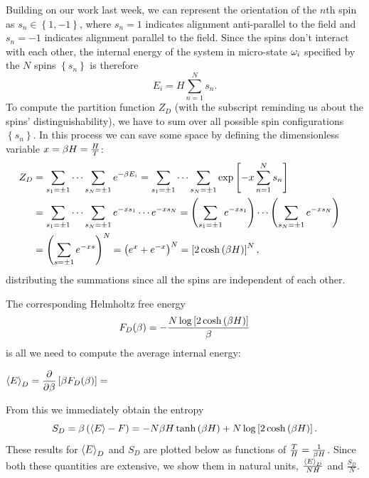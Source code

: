 Building on our work last week, we can represent the orientation of the $n$th spin as $s_n \in \left\{1, -1\right\}$, where $s_n = 1$ indicates alignment anti-parallel to the field and $s_n = -1$ indicates alignment parallel to the field.
Since the spins don't interact with each other, the internal energy of the system in micro-state $\omega_i$ specified by the $N$ spins $\left\{s_n\right\}$ is therefore
\begin{equation}
  \label{eq:spin_energy}
  E_i = H \sum_{n = 1}^N s_n.
\end{equation}
To compute the partition function $Z_D$ (with the subscript reminding us about the spins' distinguishability), we have to sum over all possible spin configurations $\left\{s_n\right\}$.
In this process we can save some space by defining the dimensionless variable $x = \beta H = \frac{H}{T}$:
\begin{align}
  Z_D & = \sum_{s_1 = \pm 1} \cdots \sum_{s_N = \pm 1} e^{-\beta E_i} = \sum_{s_1 = \pm 1} \cdots \sum_{s_N = \pm 1} \exp\left[-x \sum_{n = 1}^N s_n\right] \cr
      & = \sum_{s_1 = \pm 1} \cdots \sum_{s_N = \pm 1} e^{-x s_1} \cdots e^{-x s_N} = \left(\sum_{s_1 = \pm 1} e^{-x s_1}\right) \cdots \left(\sum_{s_N = \pm 1} e^{-x s_N}\right) \cr
      & = \left(\sum_{s = \pm 1} e^{-x s}\right)^N = \left(e^x + e^{-x}\right)^N = \left[2\cosh\left(\beta H\right)\right]^N,
\end{align}
distributing the summations since all the spins are independent of each other.

The corresponding Helmholtz free energy
\begin{equation}
  \label{eq:dist_Helm}
  F_D(\beta) = -\frac{N \log\left[2\cosh\left(\beta H\right)\right]}{\beta}
\end{equation}
is all we need to compute the average internal energy:
\begin{mdframed}
  $\displaystyle \left\langle E \right\rangle_D = \frac{\partial }{\partial \beta}\left[\beta F_D(\beta)\right] = $ \\[100 pt]
\end{mdframed}
From this we immediately obtain the entropy
\begin{equation}
  \label{eq:dist_entropy}
  S_D = \beta\left(\left\langle E \right\rangle - F\right) = -N\beta H \tanh\left(\beta H\right) + N \log\left[2\cosh\left(\beta H\right)\right].
\end{equation}
These results for $\left\langle E \right\rangle_D$ and $S_D$ are plotted below as functions of $\frac{T}{H} = \frac{1}{\beta H}$.
Since both these quantities are extensive, we show them in natural units, $\frac{\left\langle E \right\rangle_D}{NH}$ and $\frac{S_D}{N}$.

